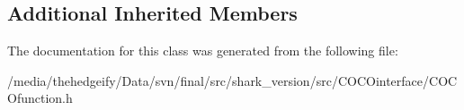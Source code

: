 \subsection*{Additional Inherited Members}


The documentation for this class was generated from the following file\+:\begin{DoxyCompactItemize}
\item 
/media/thehedgeify/\+Data/svn/final/src/shark\+\_\+version/src/\+C\+O\+C\+Ointerface/C\+O\+C\+Ofunction.\+h\end{DoxyCompactItemize}
